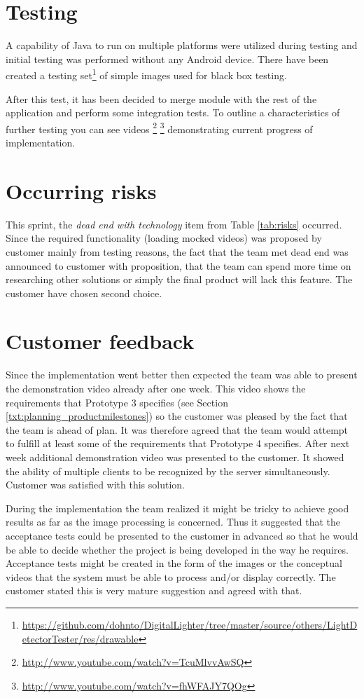 \section{Testing}
A capability of Java to run on multiple platforms were utilized during testing and initial testing was performed without any Android device.
There have been created a testing set\footnote{\url{https://github.com/dohnto/DigitalLighter/tree/master/source/others/LightDetectorTester/res/drawable}} of simple images used for black box testing.

After this test, it has been decided to merge module with the rest of the application and perform some integration tests.
To outline a characteristics of further testing you can see videos \footnote{\url{http://www.youtube.com/watch?v=TcuMlvvAwSQ}} \footnote{\url{http://www.youtube.com/watch?v=fhWFAJY7QOg}} demonstrating current progress of implementation.

\section{Occurring risks}
This sprint, the \emph{dead end with technology} item from Table \ref{tab:risks} occurred. 
Since the required functionality (loading mocked videos) was proposed by customer mainly from testing reasons, the fact that the team met dead end was announced to customer with proposition, that the team can spend more time on researching other solutions or simply the final product will lack this feature.
The customer have chosen second choice.

\section{Customer feedback}
Since the implementation went better then expected the team was able to present the demonstration video already after one week. This video shows the requirements that Prototype 3 specifies (see Section \ref{txt:planning_productmilestones}) so the customer was pleased by the fact that the team is ahead of plan. It was therefore agreed that the team would attempt to fulfill at least some of the requirements that Prototype 4 specifies. After next week additional demonstration video was presented to the customer. It showed the ability of multiple clients to be recognized by the server simultaneously. Customer was satisfied with this solution.

During the implementation the team realized it might be tricky to achieve good results as far as the image processing is concerned. Thus it suggested that the acceptance tests could be presented to the customer in advanced so that he would be able to decide whether the project is being developed in the way he requires. Acceptance tests might be created in the form of the images or the conceptual videos that the system must be able to process and/or display correctly. The customer stated this is very mature suggestion and agreed with that.

